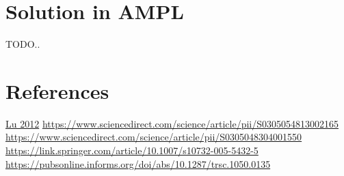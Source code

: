 \documentclass[a4paper,12pt]{article}
\begin{document}
\section{Solution in AMPL}
TODO..

\section{References} \label{sec:Ref}

\href{http://www-bcf.usc.edu/~maged/publications/MultiplePickup.pdf}{Lu 2012} \newline
\url{https://www.sciencedirect.com/science/article/pii/S0305054813002165} \newline
\url{https://www.sciencedirect.com/science/article/pii/S0305048304001550} \newline
\url{https://link.springer.com/article/10.1007/s10732-005-5432-5} \newline
\url{https://pubsonline.informs.org/doi/abs/10.1287/trsc.1050.0135} \newline
\end{document}
